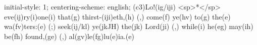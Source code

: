 initial-style: 1;
centering-scheme: english;
(c3)Lo!(ig/iji) <sp>*</sp> eve(ij)ry(i)one(i) that(g) thirst-(iji)eth,(h) (,) come(f) ye(hv) to(g) the(e) wa(fv)ters:(e) (;) seek(ij/kl) ye(jkJH) the(jk) Lord(ji) (,) while(i) he(eg) may(ih) be(fh) found,(ge) (,) al(gv)le(fg)lu(e)ia.(e)
